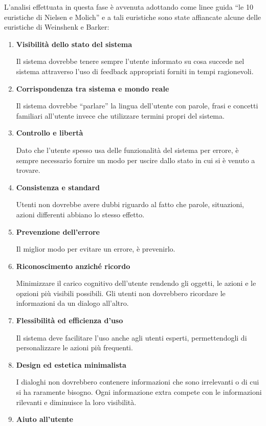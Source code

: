 \documentclass[12pt,italian,]{report}
\begin{document}
L'analisi effettuata in questa fase è avvenuta adottando come linee guida
``le 10 euristiche di Nielsen e Molich'' e a tali euristiche sono state
affiancate alcune delle euristiche di Weinshenk e Barker:

\begin{enumerate}
\def\labelenumi{\arabic{enumi}.}
\item
  \textbf{Visibilità dello stato del sistema}

  Il sistema dovrebbe tenere sempre l'utente informato su cosa succede
  nel sistema attraverso l'uso di feedback appropriati forniti in tempi
  ragionevoli.
\item
  \textbf{Corrispondenza tra sistema e mondo reale}

  Il sistema dovrebbe ``parlare'' la lingua dell'utente con parole,
  frasi e concetti familiari all'utente invece che utilizzare termini
  propri del sistema.
\item
  \textbf{Controllo e libertà}

  Dato che l'utente spesso usa delle funzionalità del sistema per
  errore, è sempre necessario fornire un modo per uscire dallo stato in
  cui si è venuto a trovare.
\item
  \textbf{Consistenza e standard}

  Utenti non dovrebbe avere dubbi riguardo al fatto che parole,
  situazioni, azioni differenti abbiano lo stesso effetto.
\item
  \textbf{Prevenzione dell'errore}

  Il miglior modo per evitare un errore, è prevenirlo.
\item
  \textbf{Riconoscimento anziché ricordo}

  Minimizzare il carico cognitivo dell'utente rendendo gli oggetti, le
  azioni e le opzioni più visibili possibili. Gli utenti non dovrebbero
  ricordare le informazioni da un dialogo all'altro.
\item
  \textbf{Flessibilità ed efficienza d'uso}

  Il sistema deve facilitare l'uso anche agli utenti esperti,
  permettendogli di personalizzare le azioni più frequenti.
\item
  \textbf{Design ed estetica minimalista}

  I dialoghi non dovrebbero contenere informazioni che sono irrelevanti
  o di cui si ha raramente bisogno. Ogni informazione extra compete con
  le informazioni rilevanti e diminuisce la loro visibilità.
\item
  \textbf{Aiuto all'utente}


\end{enumerate}
\end{document}
